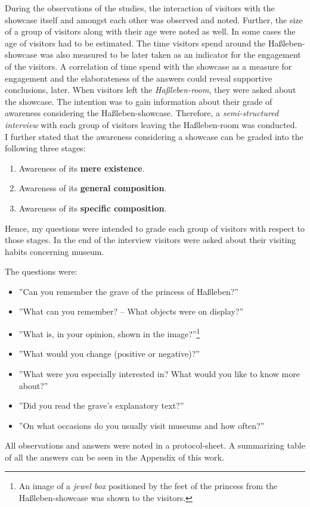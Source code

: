 During the observations of the studies, the interaction of visitors with the showcase itself and amongst each other was observed and noted. Further, the size of a group of visitors along with their age were noted as well. In some cases the age of visitors had to be estimated. The time visitors spend around the Haßleben-showcase was also measured to be later taken as an indicator for the engagement of the visitors. A correlation of time spend with the showcase as a measure for engagement and the elaborateness of the answers could reveal supportive conclusions, later. When visitors left the \textit{Haßleben-room}, they were asked about the showcase. The intention was to gain information about their grade of awareness considering the Haßleben-showcase. Therefore, a \textit{semi-structured interview} with each group of visitors leaving the Haßleben-room was conducted.
\\
I further stated that the awareness considering a showcase can be graded into the following three stages:
\begin{enumerate}
	\item Awareness of its \textbf{mere existence}.
	\item Awareness of its \textbf{general composition}.
	\item Awareness of its \textbf{specific composition}.
\end{enumerate}  

Hence, my questions were intended to grade each group of visitors with respect to those stages. In the end of the interview visitors were asked about their visiting habits concerning museum. 

The questions were:
\begin{itemize}
	\item ''Can you remember the grave of the princess of Haßleben?''
	\item ''What can you remember? -- What objects were on display?''
	\item ''What is, in your opinion, shown in the image?''\footnote{An image of a \textit{jewel box} positioned by the feet of the princess from the Haßleben-showcase was shown to the visitors.}
	\item ''What would you change (positive or negative)?''
	\item ''What were you especially interested in? What would you like to know more about?''
	\item ''Did you read the grave's explanatory text?''
	\item ''On what occasions do you usually visit museums and how often?''
\end{itemize}
All observations and answers were noted in a protocol-sheet. A summarizing table of all the answers can be seen in the Appendix of this work. 

